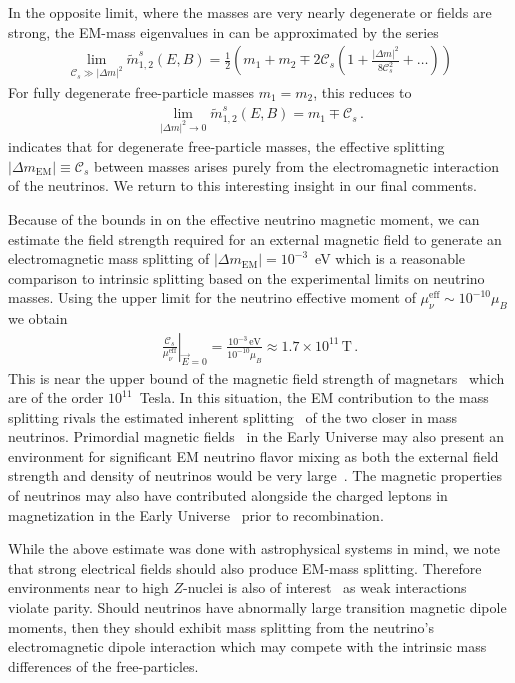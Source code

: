 In the opposite limit, where the masses are very nearly degenerate or fields are strong, the EM-mass eigenvalues in  can be approximated by the series
\begin{align}
\label{series:2}
\lim_{\mathcal{C}_{s}\gg|\Delta m|^{2}}\widetilde m_{1,2}^{s}(E,B)=\frac{1}{2}\left(m_{1}+m_{2}\mp2\mathcal{C}_{s}\left(1+\frac{|\Delta m|^{2}}{8\mathcal{C}_{s}^{2}}+\ldots\right)\right)
\end{align}
For fully degenerate free-particle masses $m_{1}=m_{2}$, this reduces to
\begin{align}
\label{series:2a}
\lim_{|\Delta m|^{2}\to0}\widetilde m_{1,2}^{s}(E,B)=m_{1}\mp\mathcal{C}_{s}\,.
\end{align}
 indicates that for degenerate free-particle masses, the effective splitting $|\Delta m_\mathrm{EM}|\equiv\mathcal{C}_{s}$ between masses arises purely from the electromagnetic interaction of the neutrinos. We return to this interesting insight in our final comments.

Because of the bounds in  on the effective neutrino magnetic moment, we can estimate the field strength required for an external magnetic field to generate an electromagnetic mass splitting of $|\Delta m_\mathrm{EM}|=10^{-3}$~eV which is a reasonable comparison to intrinsic splitting based on the experimental limits on neutrino masses. Using the upper limit for the neutrino effective moment of $\mu_{\nu}^\mathrm{eff}\sim10^{-10}\mu_{B}$ we obtain
\begin{align}
\label{estimate:1}
\left.\frac{\mathcal{C}_{s}}{\mu_{\nu}^\mathrm{eff}}\right\rvert_{\vec{E}=0}=\frac{10^{-3}\,\mathrm{eV}}{10^{-10}\mu_{B}}\approx1.7\times10^{11}\,\mathrm{T}\,.
\end{align}
This is near the upper bound of the magnetic field strength of magnetars~\citep{Kaspi:2017fwg} which are of the order $10^{11}$~Tesla. In this situation, the EM contribution to the mass splitting rivals the estimated inherent splitting~\citep{ParticleDataGroup:2022pth} of the two closer in mass neutrinos. Primordial magnetic fields~\citep{Grasso:2000wj} in the Early Universe may also present an environment for significant EM neutrino flavor mixing as both the external field strength and density of neutrinos would be very large~\citep{Rafelski:2023emw}. The magnetic properties of neutrinos may also have contributed alongside the charged leptons in magnetization in the Early Universe~\citep{Steinmetz:2023nsc} prior to recombination. 

While the above estimate was done with astrophysical systems in mind, we note that strong electrical fields should also produce EM-mass splitting. Therefore environments near to high $Z$-nuclei is also of interest~\citep{Bouchiat:1974kt,Bouchiat:1997mj,Safronova:2017xyt} as weak interactions violate parity. Should neutrinos have abnormally large transition magnetic dipole moments, then they should exhibit mass splitting from the neutrino's electromagnetic dipole interaction which may compete with the intrinsic mass differences of the free-particles.
